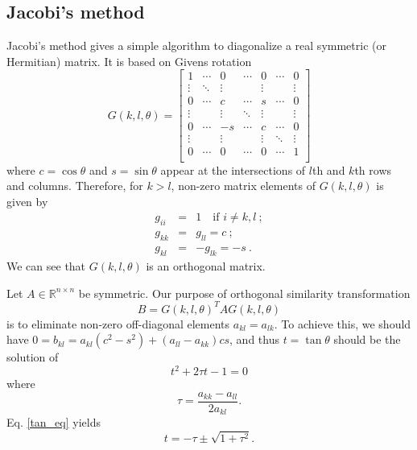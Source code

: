 \documentclass{article}
\begin{document}
	\subsection{Jacobi's method}
Jacobi's method gives a simple algorithm to diagonalize a real symmetric (or Hermitian) matrix. 
It is based on Givens rotation 
\begin{equation}\label{Givens}
G(k,l,\theta)=
\begin{bmatrix}
1  &  \cdots  & 0 & \cdots & 0 & \cdots & 0 \\
\vdots  & \ddots  & \vdots & & \vdots &  & \vdots \\
0  & \cdots & c  & \cdots & s & \cdots & 0  \\
\vdots &  & \vdots & \ddots & \vdots &  &\vdots \\
0 & \cdots & -s & \cdots & c & \cdots & 0 \\
\vdots &  & \vdots & & \vdots & \ddots & \vdots \\
0 & \cdots & 0 & \cdots & 0 & \cdots & 1 \\ 
\end{bmatrix}
\end{equation}
where $c=\cos\theta$ and $s=\sin\theta$ appear at the intersections of $l$th and $k$th rows and columns. 
Therefore, for $k>l$, non-zero matrix elements of $G(k,l,\theta)$ is given by 
\begin{eqnarray*}
g_{ii}&=&1 \quad \text{if } i\neq k,l\ ; \\
g_{kk}&=&g_{ll}=c\ ; \\
g_{kl}&=&-g_{lk}=-s\ . 
\end{eqnarray*}
We can see that $G(k,l,\theta)$ is an orthogonal matrix. 
\par
Let $A\in \mathbb{R}^{n \times n}$ be symmetric. Our purpose of orthogonal similarity transformation 
\begin{equation}\label{GivensSimilarity}
B=G(k,l,\theta)^{T}AG(k,l,\theta)
\end{equation}
is to eliminate non-zero off-diagonal elements $a_{kl}=a_{lk}$. 
To achieve this, we should have $0=b_{kl}=a_{kl}(c^2-s^2)+(a_{ll}-a_{kk})cs$, 
and thus $t=\tan\theta$ should be the solution of 
\begin{equation}\label{tan_eq}
t^2+2\tau t -1 = 0
\end{equation}
where
\begin{equation}
\tau=\frac{a_{kk}-a_{ll}}{2a_{kl}}. 
\end{equation}
Eq. \ref{tan_eq} yields 
\begin{equation}\label{root}
t=-\tau\pm\sqrt{1+\tau^2}.
\end{equation}
\end{document}
